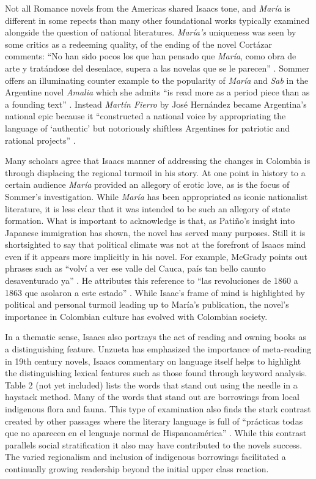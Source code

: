 \documentclass[12pt]{report}
\begin{document}
Not all Romance novels from the Americas shared Isaacs tone, and \textit{María} is different in some repects than many other foundational works typically examined alongside the question of national literatures.
\textit{María's} uniqueness was seen by some critics as a redeeming quality, of the ending of the novel Cortázar comments: \enquote{No han sido pocos los que han pensado que \textit{María}, como obra de arte y tratándose del desenlace, supera a las novelas que se le parecen} \autocite[57]{Cortazar1908}.
Sommer offers an illuminating counter example to the popularity of \textit{María} and \textit{Sab} in the Argentine novel \textit{Amalia} which she admits \enquote{is read more as a period piece than as a founding text} \autocite[111]{Sommer1991}.
Instead \textit{Martín Fierro} by José Hernández became Argentina's national epic because it \enquote{constructed a national voice by appropriating the language of \enquote{authentic} but notoriously shiftless Argentines for patriotic and rational projects} \autocite[111]{Sommer1991}.


Many scholars agree that Isaacs manner of addressing the changes in Colombia is through displacing the regional turmoil in his story. 
At one point in history to a certain audience \textit{María} provided an allegory of erotic love, as is the focus of Sommer’s investigation. 
While \textit{María} has been appropriated as iconic nationalist literature, it is less clear that it was intended to be such an allegory of state formation.
What is important to acknowledge is that, as Patiño's insight into Japanese immigration has shown, the novel has served many purposes. 
Still it is shortsighted to say that political climate was not at the forefront of Isaacs mind even if it appears more implicitly in his novel.
For example, McGrady points out phrases such as \enquote{volví a ver ese valle del Cauca, país tan bello caunto desaventurado ya} \autocite[314]{McGrady2012}.
He attributes this reference to \enquote{las revoluciones de 1860 a 1863 que asolaron a este estado} \autocite[314]{McGrady2012}.
While Isaac's frame of mind is highlighted by political and personal turmoil leading up to María's publication, the novel's importance in Colombian culture has evolved with Colombian society.


In a thematic sense, Isaacs also portrays the act of reading and owning books as a distinguishing feature. 
Unzueta has emphasized the importance of meta-reading in 19th century novels, Isaacs commentary on language itself helps to highlight the distinguishing lexical features such as those found through keyword analysis.
Table 2 (not yet included) lists the words that stand out using the needle in a haystack method.
Many of the words that stand out are borrowings from local indigenous flora and fauna.
This type of examination also finds the stark contrast created by other passages where the literary language is full of \enquote{prácticas todas que no aparecen en el lenguaje normal de Hispanoamérica} \autocite[42]{McGrady2012}.
While this contrast parallels social stratification it also may have contributed to the novels success.
The varied regionalism and inclusion of indigenous borrowings facilitated a continually growing readership beyond the initial upper class reaction.
\end{document}
